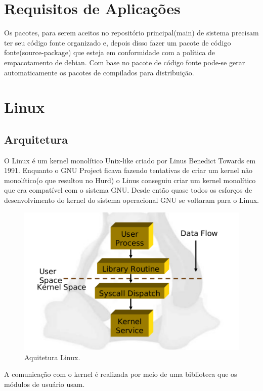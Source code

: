 \documentclass[conference]{IEEEtran}
\begin{document}
\section{Requisitos de Aplicações}\label{sec:req}
Os pacotes, para serem aceitos no repositório principal(main) de sistema precisam ter seu código fonte organizado e, depois disso fazer um pacote de código fonte(source-package) que esteja em conformidade com a política de empacotamento de debian.\cite{DebiankPackaging} Com base no pacote de código fonte pode-se gerar automaticamente os pacotes de compilados para distribuição.
\section{Linux}\label{sec:Linux}
\subsection{Arquitetura}\label{sec:LinuxArq}
O Linux é um kernel monolítico Unix-like criado por Linus Benedict Towards em 1991.\cite{LinuxHistory} Enquanto o GNU Project ficava fazendo tentativas de criar um kernel não monolítico(o que resultou no Hurd) o Linus conseguiu criar um kernel monolítico que era compatível com o sistema GNU. Desde então quase todos os esforços de desenvolvimento do kernel do sistema operacional GNU se voltaram para o Linux.\\
\begin{figure}[htb!]
	\centering
	\includegraphics[scale=0.2, trim = 0 -4 0 0,clip = true]{arqtLinux.png}
	\caption{Aquitetura Linux.}
	\label{fig:SisAqrLinux}
\end{figure}
A comunicação com o kernel é realizada por meio de uma biblioteca que os módulos de usuário usam.\\
\end{document}
